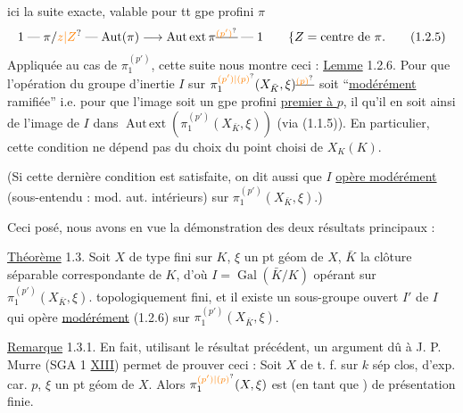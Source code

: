  ici la suite exacte, valable pour tt gpe profini $\pi$
\[
1\mathrel{\text{---}}\pi/\unsure{z|Z}\mathrel{\text{---}}\operatorname{Aut}(\pi)\longrightarrow\operatorname{Aut\,ext}\pi\deleted{^{\unsure{(p')}}}\mathrel{\text{---}}1
\qquad \{Z=\text{centre de }\pi.
\tag*{(1.2.5)}
\]
Appliquée au cas de $\pi_1^{(p')}$, cette suite nous montre ceci :
\uline{Lemme} 1.2.6. Pour que l'opération  du groupe d'inertie $I$ sur $\pi_1^{\unsure{(p')|(p)}}(X_{\bar K},\xi)\deleted{^{\unsure{(p)}}}$ soit ``\uline{modérément} ramifiée'' i.e. pour que l'image  soit un gpe profini \uline{premier à $p$}, il  qu'il en soit ainsi de l'image de $I$ dans $\operatorname{Aut\,ext}(\pi_1^{(p')}(X_{\bar K},\xi))$ (via (1.1.5)). En particulier, cette condition ne dépend pas du choix du point  choisi de $X_K(K)$.

(Si cette dernière condition est satisfaite, on dit aussi que $I$ \uline{opère modérément} (sous-entendu : mod. aut. intérieurs) sur $\pi_1^{(p')}(X_{\bar K},\xi)$.)

Ceci posé, nous avons en vue la démonstration des deux résultats principaux :

\uline{Théorème} 1.3. 
Soit $X$ de type fini sur  $K$, $\xi$ un pt géom de $X$, $\bar K$ la clôture séparable correspondante de $K$, d'où $I=\operatorname{Gal}(\bar K/K)$ opérant  sur $\pi_1^{(p')}(X_{\bar K},\xi)$.
 topologiquement   fini, et  il existe un sous-groupe ouvert $I'$ de $I$ qui opère \uline{modérément} (1.2.6) sur $\pi_1^{(p')}(X_{\bar K},\xi)$.

\uline{Remarque} 1.3.1. En fait, utilisant le résultat précédent,    un argument dû à J. P. Murre (SGA 1 \uline{XIII}) permet de prouver ceci : Soit $X$ de t. f. sur $k$ sép clos,  d'exp. car. $p$, $\xi$ un pt géom
de $X$. Alors $\pi_1^{\unsure{(p')|(p)}}(X,\xi)$ est (en tant que ) de présentation finie.

